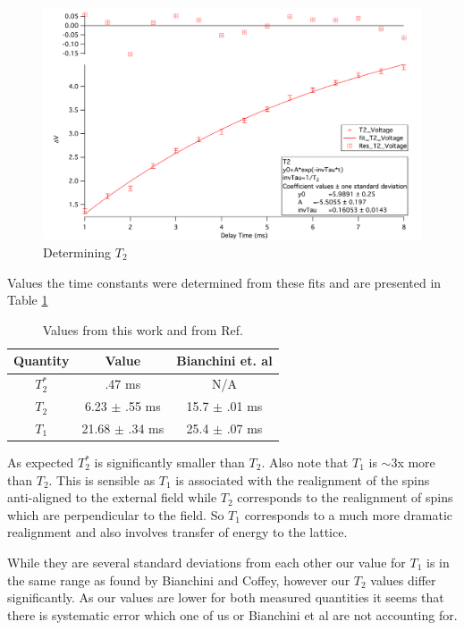 \documentclass[11pt,letterpaper]{article}
\begin{document}
\begin{figure}
  \centering
      \includegraphics[scale=.3]{T2_Fit.png}
	\caption{Determining $T_2$}
\end{figure}
\FloatBarrier
Values the time constants were determined from these fits and are presented in Table \ref{Result_Table}

\begin{table}[!h]
\label{Result_Table}
\begin{center}
	\begin{tabular}{|c|c|c|}\hline
		Quantity & Value & Bianchini et. al \\ \hline\hline
		$T_2^*$ & .47 ms &  N/A \\ \hline
		$T_2$ & 6.23 $\pm$ .55 ms &  15.7 $\pm$ .01 ms \\ \hline
		$T_1$ & 21.68 $\pm$ .34 ms &  25.4 $\pm$ .07 ms\\ \hline
	
	\end{tabular}
		\caption{Values from this work and from Ref. \cite{Bianchini}}
			
		\end{center}
	\end{table}
As expected $T_2^*$ is significantly smaller than $T_2$. Also note that $T_1$ is $\sim$3x more than $T_2$. This is sensible as $T_1$ is associated with the realignment of the spins anti-aligned to the external field while $T_2$ corresponds to the realignment of spins which are perpendicular to the field. So $T_1$ corresponds to a much more dramatic realignment and also involves transfer of energy to the lattice.

While they are several standard deviations from each other our value for $T_1$ is in the same range as found by Bianchini and Coffey, however our $T_2$ values differ significantly. As our values are lower for both measured quantities it seems that there is systematic error which one of us or Bianchini et al are not accounting for. 
\end{document}
